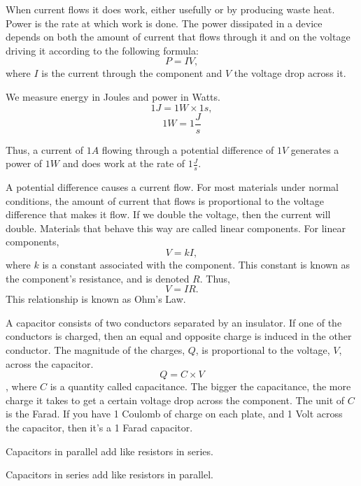 \documentclass{article}
\begin{document}
    When current flows it does work, either usefully or by producing waste heat. Power is the rate at which work is done. The power dissipated in a device depends on both the amount of current that flows through it and on the voltage driving it according to the following formula: $$P = IV,$$ where $I$ is the current through the component and $V$ the voltage drop across it.

    We measure energy in Joules and power in Watts. $$1J = 1W \times 1s,$$ $$1W=1\frac Js$$

    Thus, a current of $1A$ flowing through a potential difference of $1V$ generates a power of $1W$ and does work at the rate of $1\frac Js$.

\medskip
{}

    A potential difference causes a current flow. For most materials under normal conditions, the amount of current that flows is proportional to the voltage difference that makes it flow. If we double the voltage, then the current will double. Materials that behave this way are called linear components. For linear components, $$V=kI,$$ where $k$ is a constant associated with the component. This constant is known as the component's resistance, and is denoted $R$. Thus, $$V=IR.$$ This relationship is known as Ohm's Law.

\medskip
{}

    A capacitor consists of two conductors separated by an insulator. If one of the conductors is charged, then an equal and opposite charge is induced in the other conductor. The magnitude of the charges, $Q$, is proportional to the voltage, $V$, across the capacitor. $$Q = C \times V$$, where $C$ is a quantity called capacitance. The bigger the capacitance, the more charge it takes to get a certain voltage drop across the component. The unit of $C$ is the Farad. If you have 1 Coulomb of charge on each plate, and 1 Volt across the capacitor, then it's a 1 Farad capacitor.

    Capacitors in parallel add like resistors in series.

    Capacitors in series add like resistors in parallel.

\medskip
\noindent{\bf }
\end{document}
